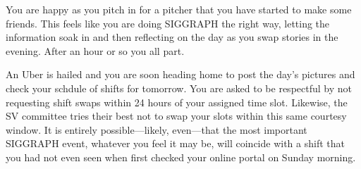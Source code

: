 \documentclass[../main.tex]{subfiles}
\begin{document}
You are happy as you pitch in for a pitcher that you have started to make some friends. This feels like you are doing SIGGRAPH the right way, letting the information soak in and then reflecting on the day as you swap stories in the evening. After an hour or so you all part.

An Uber is hailed and you are soon heading home to post the day's pictures and check your schdule of shifts for tomorrow. You are asked to be respectful by not requesting shift swaps within 24 hours of your assigned time slot. Likewise, the SV committee tries their best not to swap your slots within this same courtesy window. It is entirely possible---likely, even---that the most important SIGGRAPH event, whatever you feel it may be, will coincide with a shift that you had not even seen when first checked your online portal on Sunday morning.
\end{document}
